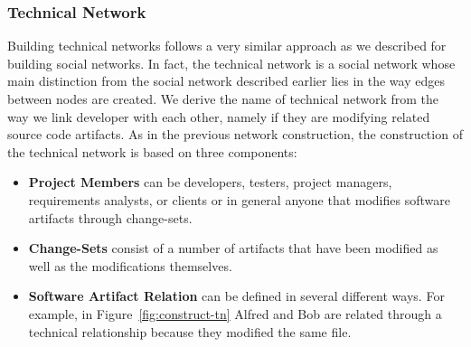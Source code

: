 
\subsubsection{Technical Network}

Building technical networks follows a very similar approach as we described for building social networks.
In fact, the technical network is a social network whose main distinction from the social network described earlier lies in the way edges between nodes are created.
We derive the name of technical network from the way we link developer with each other, namely if they are modifying related source code artifacts.
As in the previous network construction, the construction of the technical network is based on three components:

\begin{itemize}
\item\textbf{Project Members}  can be developers, testers, project managers, requirements analysts,
or clients or in general anyone that modifies software artifacts through change-sets. 

\item\textbf{Change-Sets} consist of a number of artifacts that have been modified as well as the modifications themselves.

\item\textbf{Software Artifact Relation}  can be defined in several different ways.
For example, in Figure~\ref{fig:construct-tn} Alfred and Bob are related through a technical relationship because they modified the same file.
\end{itemize}

